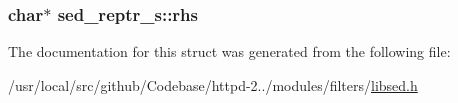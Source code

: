 \subsubsection[{\texorpdfstring{rhs}{rhs}}]{\setlength{\rightskip}{0pt plus 5cm}char$\ast$ sed\+\_\+reptr\+\_\+s\+::rhs}\hypertarget{structsed__reptr__s_a011c6ad16de2bf8d1c041b344761558e}{}\label{structsed__reptr__s_a011c6ad16de2bf8d1c041b344761558e}


The documentation for this struct was generated from the following file\+:\begin{DoxyCompactItemize}
\item 
/usr/local/src/github/\+Codebase/httpd-\/2../modules/filters/\hyperlink{libsed_8h}{libsed.\+h}\end{DoxyCompactItemize}
